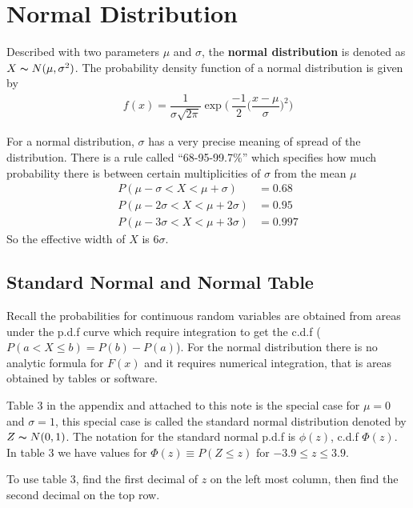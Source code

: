 \documentclass[12pt, titlepage, oneside]{article}
\renewcommand{\b}[1]{\textbf{#1}}
\begin{document}
	\setcounter{section}{9}
	\setcounter{page}{26}
 
    \section{Normal Distribution}

    Described with two parameters $\mu$ and $\sigma$, the \b{normal distribution} is denoted as $X \thicksim N(\mu, \sigma^2)$. The probability density function of a normal distribution is given by
    \begin{align}
      f(x) = \dfrac{1}{\sigma \sqrt{2 \pi}}\exp \Bigg(\,\dfrac{-1}{2}\bigg(\dfrac{x-\mu}{\sigma}\bigg)^2\Bigg)
    \end{align}

    For a normal distribution, $\sigma$ has a very precise meaning of spread of the distribution. There is a rule called ``68-95-99.7\%'' which specifies how much probability there is between certain multiplicities of $\sigma$ from the mean $\mu$
    \begin{align*}
      P( \mu - \sigma < X < \mu + \sigma) &= 0.68 \\
      P( \mu - 2\sigma < X < \mu + 2\sigma) &= 0.95\\
      P( \mu - 3\sigma < X < \mu + 3\sigma) &= 0.997
      \end{align*}
      So the effective width of $X$ is 6$\sigma$.

      \subsection{Standard Normal and Normal Table}
      Recall the probabilities for continuous random variables are obtained from areas under the p.d.f curve which require integration to get the c.d.f ($P(a < X \leq b) = P(b) - P(a)$). For the normal distribution there is no analytic formula for $F(x)$ and it requires numerical integration, that is areas obtained by tables or software.

      Table 3 in the appendix and attached to this note is the special case for $\mu = 0$ and $\sigma= 1$, this special case is called the standard normal distribution denoted by $Z \thicksim N(0,1)$. The notation for the standard normal p.d.f is $\phi(z)$, c.d.f $\Phi(z)$. In table 3 we have values for $\Phi(z) \equiv P(Z \leq z)$ for $-3.9 \leq z \leq 3.9$.

      To use table 3, find the first decimal of $z$ on the left most column, then find the second decimal on the top row. 
      
\end{document}
